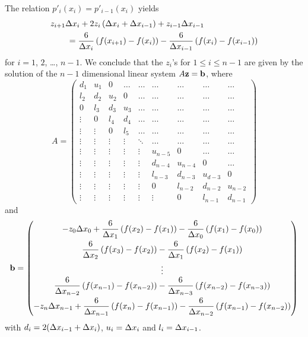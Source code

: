 The relation $p'_i(x_i) = p'_{i-1}(x_i)$ yields
\begin{equation} \label{ncs5}
\begin{split}
&z_{i+1} \Delta{x_i}  +2 z_i \left( \Delta{x_i} + \Delta{x_{i-1}}\right)
+ z_{i-1} \Delta{x_{i-1}} \\
&\qquad = \frac{6}{\Delta{x_i}}\left(f(x_{i+1}) -f(x_i) \right)
- \frac{6}{\Delta{x_{i-1}}} \left(f(x_i) - f(x_{i-1}) \right)
\end{split}
\end{equation}
for $i=1$, $2$, \ldots, $n-1$.  We conclude that the $z_i$'s for
$1\leq i \leq n-1$ are given by the solution of the
$n-1$ dimensional linear system $A \mathbf{z} = \mathbf{b}$,
where
\begin{equation} \label{ncs6}
A = \left( \begin{array}{ccccccccc}
d_1  & u_1 & 0 & \ldots & \ldots & \ldots & \ldots & \ldots & \ldots \\ 
l_2 & d_2  & u_2 & 0 & \ldots & \ldots & \ldots & \ldots & \ldots \\ 
0 & l_3 & d_3 & u_3 & \ldots & \ldots & \ldots & \ldots & \ldots \\ 
\vdots & 0 & l_4 & d_4 & \ldots & \ldots & \ldots & \ldots & \ldots \\ 
\vdots & \vdots & 0 & l_5 & \ldots & \ldots & \ldots & \ldots & \ldots \\ 
\vdots & \vdots & \vdots & \vdots & \ddots & \ldots & \ldots &
\ldots & \ldots \\
\vdots & \vdots & \vdots & \vdots & \vdots & u_{n-5} & 0 & \ldots & \ldots \\ 
\vdots & \vdots & \vdots & \vdots & \vdots & d_{n-4} &  u_{n-4} & 0 & \ldots \\ 
\vdots & \vdots & \vdots & \vdots & \vdots & l_{n-3} &  d_{n-3} & u_{d-3} & 0 \\ 
\vdots & \vdots & \vdots & \vdots & \vdots & 0 & l_{n-2} & d_{n-2} & u_{n-2} \\
\vdots & \vdots & \vdots & \vdots & \vdots & \vdots & 0 & l_{n-1} & d_{n-1} 
\end{array} \right)
\end{equation}
and
\[
\mathbf{b} = \begin{pmatrix}
\displaystyle - z_0 \Delta{x_0} + \frac{6}{\Delta{x_1}}\left(f(x_2)
  -f(x_1) \right) - \frac{6}{\Delta{x_0}} \left(f(x_1) - f(x_0) \right) \\[0.8em]
\displaystyle \frac{6}{\Delta{x_2}}\left(f(x_3) -f(x_2) \right)
- \frac{6}{\Delta{x_1}} \left(f(x_2) - f(x_1) \right) \\[0.8em]
\vdots \\
\displaystyle \frac{6}{\Delta{x_{n-2}}}\left(f(x_{n-1}) -f(x_{n-2}) \right)
- \frac{6}{\Delta{x_{n-3}}} \left(f(x_{n-2}) - f(x_{n-3}) \right) \\[0.8em]
\displaystyle - z_n \Delta{x_{n-1}}
+ \frac{6}{\Delta{x_{n-1}}}\left(f(x_n) -f(x_{n-1}) \right)
- \frac{6}{\Delta{x_{n-2}}}\left(f(x_{n-1}) - f(x_{n-2}) \right)
\end{pmatrix}
\]
with $d_i = 2(\Delta{x_{i-1}} + \Delta{x_i})$, $u_i = \Delta{x_i}$ and
$l_i = \Delta{x_{i-1}}$.

